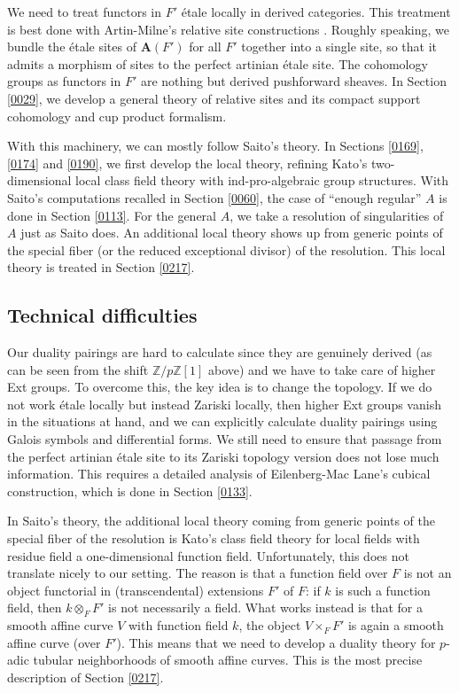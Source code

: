 \documentclass{amsart}
\theoremstyle{remark}
\numberwithin{equation}{subsection}
\newcommand{\tensor}{\mathbin{\otimes}}
\newcommand{\Z}{\mathbb{Z}}
\newcommand{\alg}[1]{\mathbf{#1}}
\begin{document}
We need to treat functors in $F'$ \'etale locally in derived categories.
This treatment is best done
with Artin-Milne's relative site constructions
\cite[\S3, ``an auxiliary site $X / S_{\mathrm{perf}}$'']{AM76}.
Roughly speaking, we bundle the \'etale sites of $\alg{A}(F')$ for all $F'$ together into a single site,
so that it admits a morphism of sites to the perfect artinian \'etale site.
The cohomology groups as functors in $F'$ are nothing but derived pushforward sheaves.
In Section \ref{0029}, we develop a general theory of relative sites
and its compact support cohomology and cup product formalism.

With this machinery, we can mostly follow Saito's theory.
In Sections \ref{0169}, \ref{0174} and \ref{0190},
we first develop the local theory,
refining Kato's two-dimensional local class field theory
with ind-pro-algebraic group structures.
With Saito's computations \cite[(4.11) (A), (B)]{Sai86} recalled in
Section \ref{0060},
the case of ``enough regular'' $A$ is done in Section \ref{0113}.
For the general $A$, we take a resolution of singularities of $A$ just as Saito does.
An additional local theory shows up from generic points
of the special fiber (or the reduced exceptional divisor) of the resolution.
This local theory is treated in Section \ref{0217}.


\subsection{Technical difficulties}
\label{0477}

Our duality pairings are hard to calculate
since they are genuinely derived (as can be seen from the shift $\Z / p \Z[1]$ above)
and we have to take care of higher Ext groups.
To overcome this, the key idea is to change the topology.
If we do not work \'etale locally but instead Zariski locally,
then higher Ext groups vanish in the situations at hand,
and we can explicitly calculate duality pairings using Galois symbols and differential forms.
We still need to ensure that
passage from the perfect artinian \'etale site to its Zariski topology version
does not lose much information.
This requires a detailed analysis of Eilenberg-Mac Lane's cubical construction,
which is done in Section \ref{0133}.

In Saito's theory, the additional local theory
coming from generic points of the special fiber of the resolution
is Kato's class field theory \cite{Kat82} for local fields
with residue field a one-dimensional function field.
Unfortunately, this does not translate nicely to our setting.
The reason is that a function field over $F$ is not an object
functorial in (transcendental) extensions $F'$ of $F$:
if $k$ is such a function field, then $k \tensor_{F} F'$ is not necessarily a field.
What works instead is that for a smooth affine curve $V$ with function field $k$,
the object $V \times_{F} F'$ is again a smooth affine curve (over $F'$).
This means that we need to develop a duality theory
for $p$-adic tubular neighborhoods of smooth affine curves.
This is the most precise description of Section \ref{0217}.
\end{document}
